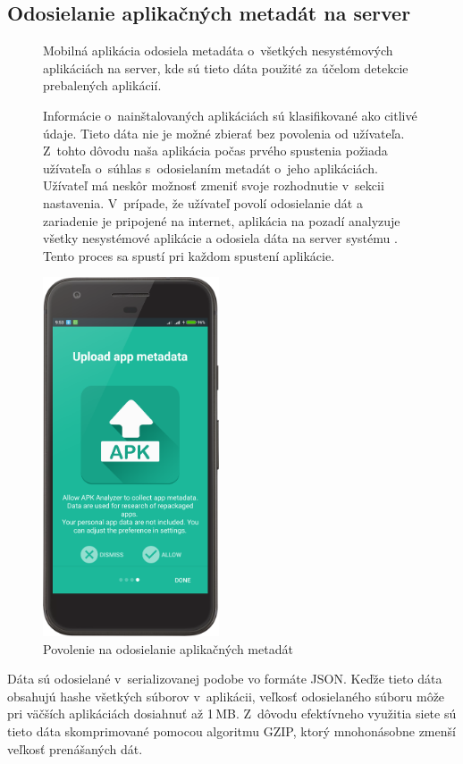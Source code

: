 \subsection{Odosielanie aplikačných metadát na server}
\begin{figure}[H]
\begin{minipage}[t]{0.48\textwidth}
Mobilná aplikácia odosiela metadáta o~všetkých nesystémových aplikáciách na server, kde sú tieto dáta použité za účelom detekcie prebalených aplikácií.

Informácie o~nainštalovaných aplikáciách sú klasifikované ako citlivé údaje. Tieto dáta nie je možné zbierať bez povolenia od užívateľa. Z~tohto dôvodu naša aplikácia počas prvého spustenia požiada užívateľa o~súhlas s~odosielaním metadát o~jeho aplikáciách. Užívateľ má neskôr možnosť zmeniť svoje rozhodnutie v~sekcii nastavenia.
V~prípade, že užívateľ povolí odosielanie dát a zariadenie je pripojené na internet, aplikácia na pozadí analyzuje všetky nesystémové aplikácie a odosiela dáta na server systému . Tento proces sa spustí pri každom spustení aplikácie.
\end{minipage}%
\hfill
\centering
\begin{minipage}[t][][b]{0.45\textwidth}
\centering
    \includegraphics[width=5.2cm]{images/app/upload_device.png}
\centering
\caption{Povolenie na odosielanie aplikačných metadát}
\label{fig:upload-dialog}
\end{minipage}%
\end{figure}

Dáta sú odosielané v~serializovanej podobe vo formáte JSON. Keďže tieto dáta obsahujú hashe všetkých súborov v~aplikácii, veľkosť odosielaného súboru môže pri väčších aplikáciách dosiahnuť až 1\,MB. Z~dôvodu efektívneho využitia siete sú tieto dáta skomprimované pomocou algoritmu GZIP, ktorý mnohonásobne zmenší veľkosť prenášaných dát.

